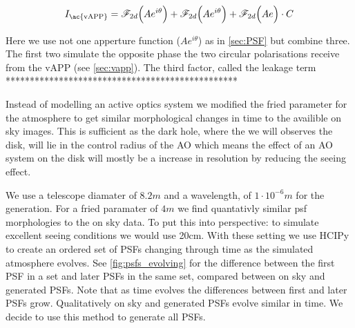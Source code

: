 \begin{equation}
I_\text{\ac{vAPP}} = \mathscr{F}_{2d}\Big( Ae^{i\theta}\Big) + \mathscr{F}_{2d}\Big( Ae^{i\theta}\Big) + \mathscr{F}_{2d}\Big( Ae \Big) \cdot C
\end{equation}

Here we use not one apperture function ($Ae^{i\theta}$) as in \autoref{sec:PSF} but combine three. The first two simulate the opposite phase the two circular polarisations receive from the \ac{vAPP} (see \autoref{sec:vapp}). The third factor, called the leakage term ************************************************

Instead of modelling an active optics system we modified the fried parameter for the atmosphere to get similar morphological changes in time to the availible on sky images. This is sufficient as the dark hole, where the we will observes the disk, will lie in the control radius of the \ac{AO} which means the effect of an \ac{AO} system on the disk will mostly be a increase in resolution by reducing the seeing effect.

We use a telescope diamater of $8.2m$ and a wavelength, of $1\cdot 10^{-6}m$ for the generation. For a fried paramater of $4m$ we find quantativly similar psf morphologies to the on sky data. To put this into perspective: to simulate excellent seeing conditions we would use 20cm. With these setting we use \ac{HCIPy} to create an ordered set of \acp{PSF} changing through time as the simulated atmosphere evolves. See \autoref{fig:psfs_evolving} for the difference between the first \ac{PSF} in a set and later \acp{PSF} in the same set, compared between on sky and generated \acp{PSF}. Note that as time evolves the differences between first and later \acp{PSF} grow. Qualitatively on sky and generated \acp{PSF} evolve similar in time. We decide to use this method to generate all \acp{PSF}.


